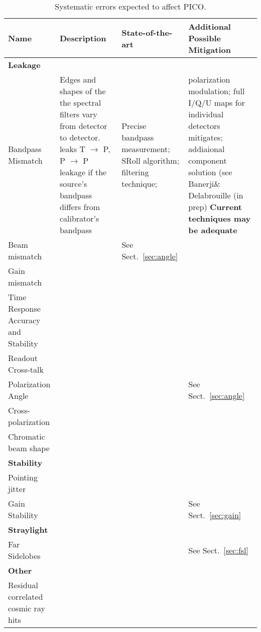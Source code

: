\documentclass[PICOReport.tex]{subfiles}
\begin{document}
\begin{table}[h!]
\centering
\scriptsize
 \begin{tabular}{p{4.1cm} p{4.1cm} p{4.1cm} p{4.1cm}}
 \hline
\textbf{Name} & \textbf{Description} & \textbf{State-of-the-art} & \textbf{Additional Possible Mitigation} \\
 \hline
\textbf{Leakage} & &\\
 Bandpass Mismatch & 
 Edges and shapes of the the spectral filters vary from detector to detector. leaks T $\to$ P, P $\to$ P leakage if the source's bandpass differs from calibrator's bandpass\cite{Hoang_2017} & Precise bandpass measurement\cite{Pajot_2010};
SRoll algorithm\cite{Planck_Lowell}; filtering technique\cite{CORE_systematics};   &
polarization modulation; full I/Q/U maps for individual detectors
                                                                                     mitigates;
                                                                                     addiaional
                                                                                     component
                                                                                     solution
                                                                                     (see
                                                                                     Banerji\&
                                                                                              Delabrouille
                                                                                               (in
                                                                                             prep)
                                                                                               \textbf{Current
                                                                                     techniques may be adequate}  \\
Beam mismatch & & See Sect.~\ref{sec:angle}
\\
Gain mismatch &
\\
Time Response Accuracy and Stability  &
\\
Readout Cross-talk & &
\\
Polarization Angle & & &
See Sect.~\ref{sec:angle}
\\

Cross-polarization &
\\
Chromatic beam shape
\\
\hline 
\textbf{Stability} & & \\

Pointing jitter
\\

Gain Stability & & &
See Sect.~\ref{sec:gain}
\\
\hline
\textbf{Straylight} & & \\
Far Sidelobes& & &
See Sect.~\ref{sec:fsl}\\
 \hline
\textbf{Other} \\
Residual correlated cosmic ray hits &
\\
\hline
 \end{tabular}
\caption{\label{tbl:SystematicsList} Systematic errors expected to affect PICO.}
 \end{table}
\end{document}

